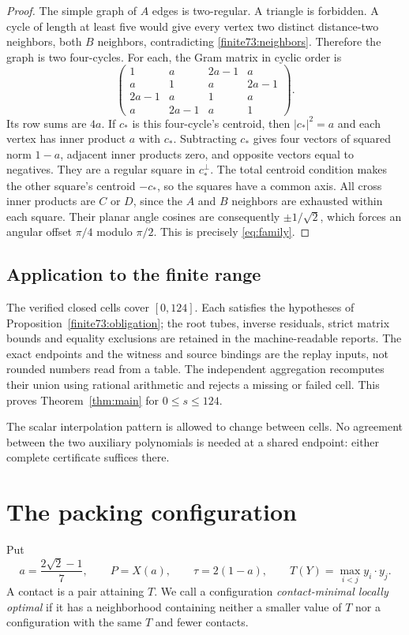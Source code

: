 \documentclass[12pt,reqno]{amsart}
\theoremstyle{definition}
\numberwithin{equation}{section}
\begin{document}
\begin{proof}
The simple graph of $A$ edges is two-regular. A triangle is forbidden. A cycle of length at least five would give every vertex two distinct distance-two neighbors, both $B$ neighbors, contradicting \eqref{finite73:neighbors}. Therefore the graph is two four-cycles. For each, the Gram matrix in cyclic order is
\begin{equation}\label{finite73:squaregram}
 \begin{pmatrix}
 1&a&2a-1&a\\a&1&a&2a-1\\2a-1&a&1&a\\a&2a-1&a&1
 \end{pmatrix}.
\end{equation}
Its row sums are $4a$. If $c_*$ is this four-cycle's centroid, then $|c_*|^2=a$ and each vertex has inner product $a$ with $c_*$. Subtracting $c_*$ gives four vectors of squared norm $1-a$, adjacent inner products zero, and opposite vectors equal to negatives. They are a regular square in $c_*^\perp$. The total centroid condition makes the other square's centroid $-c_*$, so the squares have a common axis. All cross inner products are $C$ or $D$, since the $A$ and $B$ neighbors are exhausted within each square. Their planar angle cosines are consequently $\pm1/\sqrt2$, which forces an angular offset $\pi/4$ modulo $\pi/2$. This is precisely \eqref{eq:family}.
\end{proof}



\subsection{Application to the finite range}
The verified closed cells cover $[0,124]$. Each satisfies the hypotheses
of Proposition~\ref{finite73:obligation}; the root tubes, inverse
residuals, strict matrix bounds and equality exclusions are retained in
the machine-readable reports. The exact endpoints and the witness and
source bindings are the replay inputs, not rounded numbers read from a
table. The independent aggregation recomputes their union using rational
arithmetic and rejects a missing or failed cell. This proves
Theorem~\ref{thm:main} for $0\le s\le124$.

The scalar interpolation pattern is allowed to change between cells.
No agreement between the two auxiliary polynomials is needed at a shared
endpoint: either complete certificate suffices there.

\section{The packing configuration}\label{r3:packing}
Put
\[
 a=\frac{2\sqrt2-1}{7},\qquad P=X(a),\qquad \tau=2(1-a),\qquad
 T(Y)=\max_{i<j}y_i\cdot y_j.
\]
A contact is a pair attaining $T$. We call a configuration \emph{contact-minimal
locally optimal} if it has a neighborhood containing neither a smaller value
of $T$ nor a configuration with the same $T$ and fewer contacts.
\end{document}
